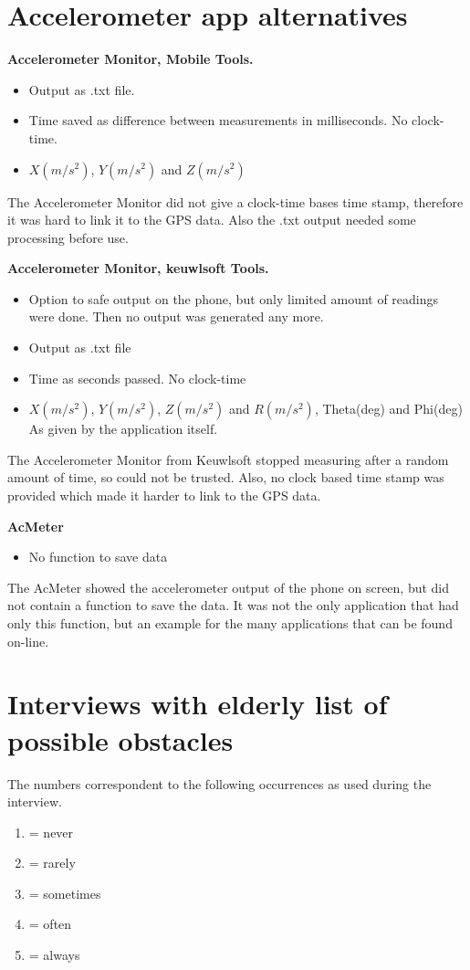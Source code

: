 \begin{appendix}
\section{Accelerometer app alternatives}\label{Aapps}
\textbf{Accelerometer Monitor, Mobile Tools.}
\begin{itemize}
	\item Output as .txt file. 
	\item Time saved as difference between measurements in milliseconds. No clock-time.
	\item $X(m/s^2)$, $Y(m/s^2)$ and $Z(m/s^2)$
\end{itemize}
The Accelerometer Monitor did not give a clock-time bases time stamp, therefore it was hard to link it to the GPS data. Also the .txt output needed some processing before use. 

\textbf{Accelerometer Monitor, keuwlsoft Tools.}
\begin{itemize}
	\item Option to safe output on the phone, but only limited amount of readings were done. Then no output was generated any more.
	\item Output as .txt file
	\item Time as seconds passed. No clock-time
	\item $X(m/s^2)$, $Y(m/s^2)$, $Z(m/s^2)$ and $R(m/s^2)$, Theta(deg) and Phi(deg) As given by the application itself. 
\end{itemize}
The Accelerometer Monitor from Keuwlsoft stopped measuring after a random amount of time, so could not be trusted. Also, no clock based time stamp was provided which made it harder to link to the GPS data.

\textbf{AcMeter}
\begin{itemize}
	\item No function to save data
\end{itemize}
The AcMeter showed the accelerometer output of the phone on screen, but did not contain a function to save the data. It was not the only application that had only this function, but an example for the many applications that can be found on-line. 

\section{Interviews with elderly list of possible obstacles}\label{Aelderly}
The numbers correspondent to the following occurrences as used during the interview. 
\begin{enumerate}
	\item = never
	\item = rarely
	\item = sometimes
	\item = often
	\item = always
\end{enumerate}


\end{appendix}
